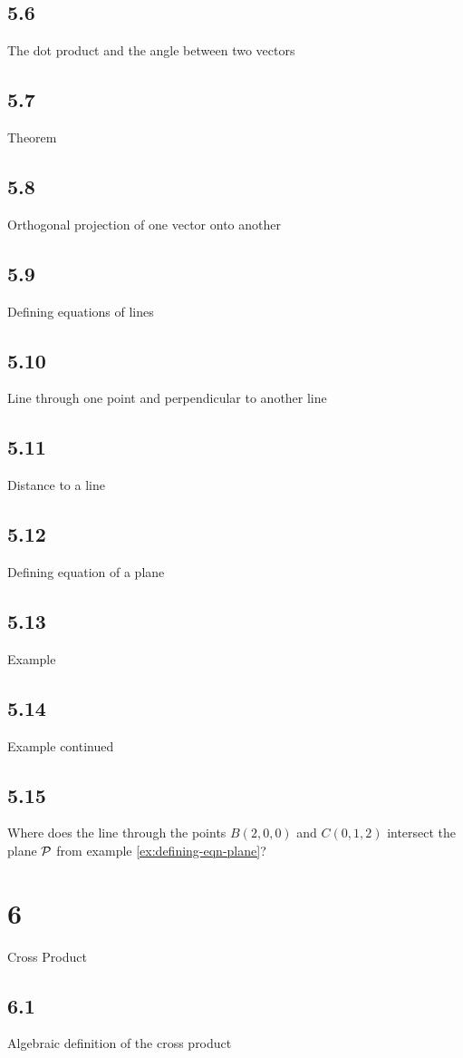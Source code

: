 \subsection{5.6}{The dot product and the angle between two vectors}
\subsection{5.7}{Theorem}
\subsection{5.8}{Orthogonal projection of one vector onto another}
\subsection{5.9}{Defining equations of lines}
\subsection{5.10}{Line through one point and perpendicular to another line}
\subsection{5.11}{Distance to a line}
\subsection{5.12}{Defining equation of a plane}
\subsection{5.13}{Example}
\subsection{5.14}{Example continued}
\subsection{5.15}{Where does the line through the points $B (2,0,0)$ and $C (0,1,2)$ intersect the plane ${\cal P}$ from example \ref {ex:defining-eqn-plane}?}
\section{6}{Cross Product}
\subsection{6.1}{Algebraic definition of the cross product}
